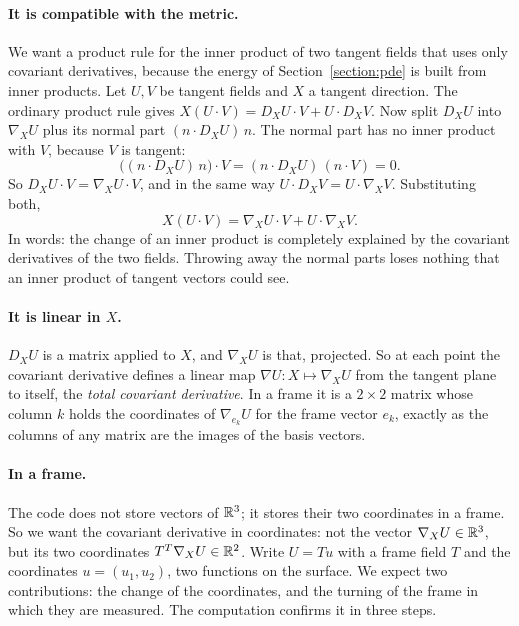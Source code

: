 \paragraph{It is compatible with the metric.} We want a product rule for the inner product of two tangent fields that uses only covariant derivatives, because the energy of Section~\ref{section:pde} is built from inner products. Let $U, V$ be tangent fields and $X$ a tangent direction. The ordinary product rule gives $X(U\cdot V) = D_X U \cdot V + U \cdot D_X V$. Now split $D_X U$ into $\nabla_X U$ plus its normal part $(n\cdot D_X U)\, n$. The normal part has no inner product with $V$, because $V$ is tangent:
\begin{equation*}
\big((n\cdot D_X U)\, n\big)\cdot V = (n\cdot D_X U)\, (n \cdot V) = 0 .
\end{equation*}
So $D_X U\cdot V = \nabla_X U \cdot V$, and in the same way $U\cdot D_X V = U\cdot\nabla_X V$. Substituting both,
\begin{equation}
\label{eqn:metric_compatible}
X (U \cdot V) = \nabla_X U \cdot V + U \cdot \nabla_X V .
\end{equation}
In words: the change of an inner product is completely explained by the covariant derivatives of the two fields. Throwing away the normal parts loses nothing that an inner product of tangent vectors could see.

\paragraph{It is linear in $X$.} $D_X U$ is a matrix applied to $X$, and $\nabla_X U$ is that, projected. So at each point the covariant derivative defines a linear map $\nabla U : X \mapsto \nabla_X U$ from the tangent plane to itself, the \emph{total covariant derivative}. In a frame it is a $2 \times 2$ matrix whose column $k$ holds the coordinates of $\nabla_{e_k} U$ for the frame vector $e_k$, exactly as the columns of any matrix are the images of the basis vectors.

\paragraph{In a frame.} The code does not store vectors of $\mathbb{R}^3$; it stores their two coordinates in a frame. So we want the covariant derivative in coordinates: not the vector $\nabla_X U \in \mathbb{R}^3$, but its two coordinates $T^T \nabla_X U \in \mathbb{R}^2$. Write $U = T u$ with a frame field $T$ and the coordinates $u = (u_1, u_2)$, two functions on the surface. We expect two contributions: the change of the coordinates, and the turning of the frame in which they are measured. The computation confirms it in three steps.

